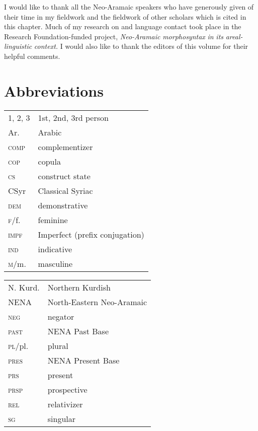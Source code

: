 \documentclass[output=paper]{langsci/langscibook}
\begin{document}
I would like to thank all the Neo-Aramaic speakers who have generously given of their time in my fieldwork and the fieldwork of other scholars which is cited in this chapter. Much of my research on  and language contact took place in the  Research Foundation-funded project, \textit{Neo-Aramaic} \textit{morphosyntax} \textit{in} \textit{its} \textit{areal-linguistic} \textit{context.} I would also like to thank the editors of this volume for their helpful comments.


\section*{Abbreviations}

\begin{tabularx}{.5\textwidth}[t]{@{}lQ@{}}
\textsc{1, 2, 3} & 1st, 2nd, 3rd person \\
Ar.            & Arabic\\
\textsc{comp}    & {complementizer}\\
\textsc{cop}     & {copula}\\
\textsc{cs}     & construct state\\
CSyr          & Classical Syriac\\
\textsc{dem}     & demonstrative \\
\textsc{f}/f.    & feminine\\
\textsc{impf}   & Imperfect (prefix conjugation)\\
\textsc{ind}     & indicative\\
\textsc{m}/m.    & masculine\\
\end{tabularx}%
\begin{tabularx}{.5\textwidth}[t]{@{}lQ@{}}
N. Kurd.        & Northern Kurdish \\ 
NENA            & North-Eastern Neo-Aramaic\\
\textsc{neg}    & negator\\
\textsc{past}   & {NENA} Past Base\\
\textsc{pl}/pl.  & plural\\
\textsc{pres}    & {NENA} Present Base \\
\textsc{prs}    & present \\
\textsc{prsp}    & {prospective} \\
\textsc{rel}     & {relativizer}\\
\textsc{sg}  & singular
\end{tabularx}%
\end{document}
